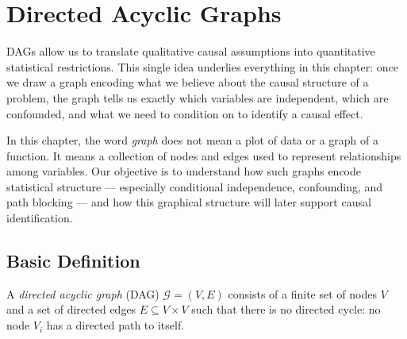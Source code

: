 \documentclass[
  a4paper,
]{book}
\newcommand{\Gcal}{\mathcal{G}}
\begin{document}
\section{Directed Acyclic Graphs}\label{directed-acyclic-graphs}

DAGs allow us to translate qualitative causal assumptions into
quantitative statistical restrictions. This single idea underlies
everything in this chapter: once we draw a graph encoding what we
believe about the causal structure of a problem, the graph tells us
exactly which variables are independent, which are confounded, and what
we need to condition on to identify a causal effect.

\begin{tcolorbox}[enhanced jigsaw, arc=.35mm, bottomrule=.15mm, bottomtitle=1mm, breakable, colback=white, colbacktitle=quarto-callout-note-color!10!white, colframe=quarto-callout-note-color-frame, coltitle=black, left=2mm, leftrule=.75mm, opacityback=0, opacitybacktitle=0.6, rightrule=.15mm, title={Remark}, titlerule=0mm, toprule=.15mm, toptitle=1mm]

In this chapter, the word \emph{graph} does not mean a plot of data or a
graph of a function. It means a collection of nodes and edges used to
represent relationships among variables. Our objective is to understand
how such graphs encode statistical structure --- especially conditional
independence, confounding, and path blocking --- and how this graphical
structure will later support causal identification.

\end{tcolorbox}

\subsection{Basic Definition}\label{basic-definition}

\begin{tcolorbox}[enhanced jigsaw, arc=.35mm, bottomrule=.15mm, bottomtitle=1mm, breakable, colback=white, colbacktitle=quarto-callout-note-color!10!white, colframe=quarto-callout-note-color-frame, coltitle=black, left=2mm, leftrule=.75mm, opacityback=0, opacitybacktitle=0.6, rightrule=.15mm, title={Definition: Directed Acyclic Graph}, titlerule=0mm, toprule=.15mm, toptitle=1mm]

A \emph{directed acyclic graph} (DAG) \(\Gcal = (V, E)\) consists of a
finite set of nodes \(V\) and a set of directed edges
\(E \subseteq V \times V\) such that there is no directed cycle: no node
\(V_i\) has a directed path to itself.

\end{tcolorbox}
\end{document}
